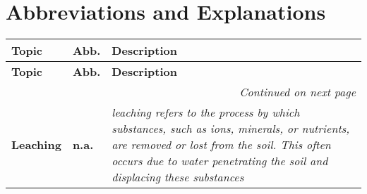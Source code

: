 \chapter{Abbreviations and Explanations}
\setlength{\headheight}{12.71342pt}
\addtolength{\topmargin}{-0.71342pt}


\begin{longtable}{| p{5cm} | p{2cm} | p{7.5cm} |}
    \hline
    \textbf{Topic} & \textbf{Abb.} & \textbf{Description} \\ 
    \hline
    \endfirsthead
    
    \hline
    \textbf{Topic} & \textbf{Abb.} & \textbf{Description} \\ 
    \hline
    \endhead
    
    \hline \multicolumn{3}{r}{\textit{Continued on next page}} \\ 
    \endfoot
    
    \hline
    \endlastfoot
    
    \textbf{Leaching} & \textbf{n.a.} & \textit{leaching refers to the process by which substances, such as ions, minerals, or nutrients, are removed or lost from the soil. This often occurs due to water penetrating the soil and displacing these substances} \\
    \hline
    \end{longtable}

